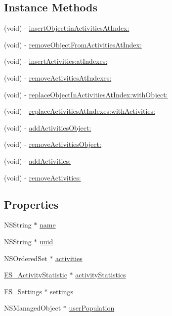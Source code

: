\subsection*{Instance Methods}
\begin{DoxyCompactItemize}
\item 
(void) -\/ \hyperlink{interface_e_s___user_ad5f49e8aaa1e143978b51a625c543745}{insert\+Object\+:in\+Activities\+At\+Index\+:}
\item 
(void) -\/ \hyperlink{interface_e_s___user_aed354c2e3a0546f04bec47b5a66043c5}{remove\+Object\+From\+Activities\+At\+Index\+:}
\item 
(void) -\/ \hyperlink{interface_e_s___user_a49fbde6aef1a5da3d99273be78809508}{insert\+Activities\+:at\+Indexes\+:}
\item 
(void) -\/ \hyperlink{interface_e_s___user_af822b76e969c607f6c1134cec7c3b98b}{remove\+Activities\+At\+Indexes\+:}
\item 
(void) -\/ \hyperlink{interface_e_s___user_a8fec20bc65f3da30179fd131814d3dc5}{replace\+Object\+In\+Activities\+At\+Index\+:with\+Object\+:}
\item 
(void) -\/ \hyperlink{interface_e_s___user_aac490ec84102d4a104ffdf54e1d52df5}{replace\+Activities\+At\+Indexes\+:with\+Activities\+:}
\item 
(void) -\/ \hyperlink{interface_e_s___user_a0b7cec517bac54cea0553a2fa35638c2}{add\+Activities\+Object\+:}
\item 
(void) -\/ \hyperlink{interface_e_s___user_abbe5c2dc945b27ec3af3c7bb9f211dc3}{remove\+Activities\+Object\+:}
\item 
(void) -\/ \hyperlink{interface_e_s___user_adf7e5867a32e7e5e3111667e4769466b}{add\+Activities\+:}
\item 
(void) -\/ \hyperlink{interface_e_s___user_aaec6290646915eff69b7bcfc84d7c522}{remove\+Activities\+:}
\end{DoxyCompactItemize}
\subsection*{Properties}
\begin{DoxyCompactItemize}
\item 
N\+S\+String $\ast$ \hyperlink{interface_e_s___user_a00e6de7c4908cd712d1266d2633e4dc8}{name}
\item 
N\+S\+String $\ast$ \hyperlink{interface_e_s___user_aedbce3d5006a7599ea5c027a64b6b6bb}{uuid}
\item 
N\+S\+Ordered\+Set $\ast$ \hyperlink{interface_e_s___user_af6e5f5b1c3579b35ca7bc4ecc4680547}{activities}
\item 
\hyperlink{interface_e_s___activity_statistic}{E\+S\+\_\+\+Activity\+Statistic} $\ast$ \hyperlink{interface_e_s___user_a744640d9a7656b1a333275b3ac89d0ce}{activity\+Statistics}
\item 
\hyperlink{interface_e_s___settings}{E\+S\+\_\+\+Settings} $\ast$ \hyperlink{interface_e_s___user_a86bad01b84ccb6a091253696509f54ff}{settings}
\item 
N\+S\+Managed\+Object $\ast$ \hyperlink{interface_e_s___user_a7b71663678fccdcad1762451b378ec1b}{user\+Population}
\end{DoxyCompactItemize}


